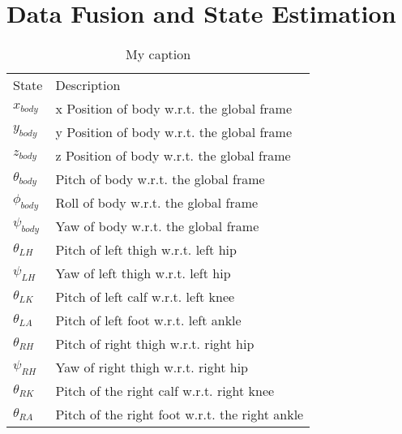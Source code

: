 \chapter{Data Fusion and State Estimation}

\begin{table}[!ht]
\centering
\label{my-label}
\begin{tabular}{ll}
State & Description \\
$x_{body}$  	    	&x Position of body w.r.t. the global frame\\
$y_{body}$     	 	    &y Position of body w.r.t. the global frame\\
$z_{body}$     		    &z Position of body w.r.t. the global frame\\

$\theta_{body}$      	&Pitch of body w.r.t. the global frame\\
$\phi_{body}$      	    &Roll of body w.r.t. the global frame\\
$\psi_{body}$      	    &Yaw of body w.r.t. the global frame\\

$\theta_{LH}$     	&Pitch of left thigh w.r.t. left hip\\
$\psi_{LH}$      	&Yaw of left thigh w.r.t. left hip\\
$\theta_{LK}$    	&Pitch of left calf w.r.t. left knee\\
$\theta_{LA}$   	&Pitch of left foot w.r.t. left ankle\\

$\theta_{RH}$    	&Pitch of right thigh w.r.t. right hip\\
$\psi_{RH}$      	&Yaw of right thigh w.r.t. right hip\\
$\theta_{RK}$   	&Pitch of the right calf w.r.t. right knee\\
$\theta_{RA}$  		&Pitch of the right foot w.r.t. the right ankle\\

\end{tabular}
\caption{My caption}
\end{table}





